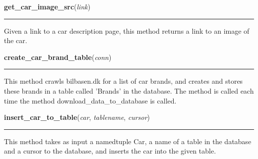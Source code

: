     \vspace{0.5ex}

\hspace{.8\funcindent}\begin{boxedminipage}{\funcwidth}

    \raggedright \textbf{get\_car\_image\_src}(\textit{link})

    \vspace{-1.5ex}

    \rule{\textwidth}{0.5\fboxrule}
\setlength{\parskip}{2ex}
    Given a link to a car description page, this method returns a link to 
    an image of the car.

\setlength{\parskip}{1ex}
    \end{boxedminipage}

    \label{BilbasenDataMining:bilbasen:create_car_brand_table}

    \vspace{0.5ex}

\hspace{.8\funcindent}\begin{boxedminipage}{\funcwidth}

    \raggedright \textbf{create\_car\_brand\_table}(\textit{conn})

    \vspace{-1.5ex}

    \rule{\textwidth}{0.5\fboxrule}
\setlength{\parskip}{2ex}
    This method crawls bilbasen.dk for a list of car brands, and creates 
    and stores these brands in a table called 'Brands' in the database. The
    method is called each time the method download\_data\_to\_database is 
    called.

\setlength{\parskip}{1ex}
    \end{boxedminipage}

    \label{BilbasenDataMining:bilbasen:insert_car_to_table}

    \vspace{0.5ex}

\hspace{.8\funcindent}\begin{boxedminipage}{\funcwidth}

    \raggedright \textbf{insert\_car\_to\_table}(\textit{car}, \textit{tablename}, \textit{cursor})

    \vspace{-1.5ex}

    \rule{\textwidth}{0.5\fboxrule}
\setlength{\parskip}{2ex}
    This method takes as input a namedtuple Car, a name of a table in the 
    database and a cursor to the database, and inserts the car into the 
    given table.

\setlength{\parskip}{1ex}
    \end{boxedminipage}

